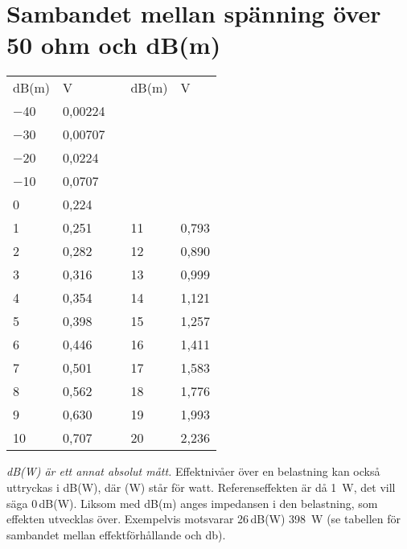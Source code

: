 \section{Sambandet mellan spänning över 50 ohm och dB(m)}

\begin{center}
\begin{tabular}{l|lp{1cm}l|l}
  dB(m) & V & & dB(m) & V \\
  \cline{1-2} \cline{4-5}
  \num{-40} & 0,00224 & & & \\
  \num{-30} & 0,00707 & & & \\
  \num{-20} & 0,0224  & & & \\
  \num{-10} & 0,0707  & & & \\
  0   & 0,224   & & & \\
  1   & 0,251   & & 11 & 0,793 \\
  2   & 0,282   & & 12 & 0,890 \\
  3   & 0,316   & & 13 & 0,999 \\
  4   & 0,354   & & 14 & 1,121 \\
  5   & 0,398   & & 15 & 1,257 \\
  6   & 0,446   & & 16 & 1,411 \\
  7   & 0,501   & & 17 & 1,583 \\
  8   & 0,562   & & 18 & 1,776 \\
  9   & 0,630   & & 19 & 1,993 \\
  10  & 0,707   & & 20 & 2,236 \\
\end{tabular}
\end{center}

\emph{dB(W) är ett annat absolut mått.}
Effektnivåer över en belastning kan också uttryckas i dB(W), där (W) står
för watt.
Referenseffekten är då \SI{1}{\watt}, det vill säga 0\,dB(W).
Liksom med dB(m) anges impedansen i den belastning, som effekten utvecklas
över.
Exempelvis motsvarar 26\,dB(W) \SI{398}{\watt} (se tabellen för sambandet mellan
effektförhållande och \si{\decibel}).
